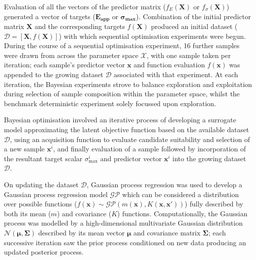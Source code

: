 Evaluation of all the vectors of the predictor matrix (\(f_{E}(\mathbf{X})\)
 or \(f_{\sigma}(\mathbf{X})\)) generated a vector of targets 
 (\(\mathbf{E_{\text{app}}}\) or
 \(\bm{\sigma_{\text{max}}}\)).
Combination of the initial predictor matrix \(\mathbf{X}\) and the
 corresponding targets \(f(\mathbf{X})\) produced an initial dataset
 (\(\mathcal{D}=[\mathbf{X},f(\mathbf{X})]\)) with which sequential
 optimisation experiments were begun.
During the course of a sequential optimisation experiment, 16 further samples
 were drawn from across the parameter space \(\mathcal{X}\), with one sample taken per
 iteration; each sample's predictor vector \(\mathbf{x}\) and function
 evaluation \(f(\mathbf{x})\) was appended to the growing dataset
 \(\mathcal{D}\) associated with that experiment.
At each iteration, the Bayesian experiments strove to balance exploration and
 exploitation during selection of sample composition within the parameter
 space, whilst the benchmark deterministic experiment solely focussed upon
 exploration.

Bayesian optimisation involved an iterative process of developing a surrogate
 model approximating the latent objective function based on the available
 dataset \(\mathcal{D}\), using an acquisition function to evaluate
 candidate suitability and selection of a new sample \(\mathbf{x}^{i}\), and
 finally evaluation of a sample followed by incorporation of the resultant
 target scalar \(\sigma_{\mathrm{max}}^{i}\) and predictor vector \(\mathbf{x}^{i}\)
 into the growing dataset \(\mathcal{D}\).

On updating the dataset \(\mathcal{D}\), Gaussian process regression was used
 to develop a Gaussian process regression model \(\mathcal{GP}\) which can
 be considered a distribution over possible functions
 (\(f(\mathbf{x})\sim \mathcal{GP}(m(\mathbf{x}),K(\mathbf{x},\mathbf{x}'))\))
 fully described by both its mean (\(m\)) and covariance (\(K\)) functions.
Computationally, the Gaussian process was modelled by a high-dimensional
 multivariate Gaussian distribution \(\mathcal{N}(\bm{\mu},\bm{\Sigma})\)
 described by its mean vector \(\bm{\mu}\) and covariance matrix
 \(\bm{\Sigma}\); each successive iteration saw the prior process conditioned
 on new data producing an updated posterior process.

